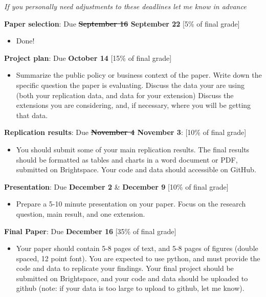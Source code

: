 \documentclass[compress, 8pt]{beamer}
\begin{document}
\begin{frame}{}

\alert{\emph{If you personally need adjustments to these deadlines let me know in advance}}

\textbf{Paper selection}: Due \textbf{\sout{September 16} September 22} [5\% of final grade]
\begin{itemize}
\item Done! 
\end{itemize}

\textbf{Project plan}: Due \textbf{October 14} [15\% of final grade] 
\begin{itemize}
\item Summarize the public policy or business context of the paper. 
Write down the specific question the paper is evaluating.
Discuss the data your are using (both your replication data, and data for your extension)
Discuss the extensions you are considering, and, if necessary, where you will be getting that data. 
\end{itemize} 

\textbf{Replication results}: \alert{Due \textbf{\sout{November 4} November 3}}: [10\% of final grade]
\begin{itemize}
\item You should submit some of your main replication results. The final results should be formatted as tables and charts in a word document or PDF, submitted on Brightspace. Your code and data should accessible on GitHub.
\end{itemize}

\textbf{Presentation}: Due \textbf{December 2} \& \textbf{December 9} [10\% of final grade]
\begin{itemize}
\item Prepare a 5-10 minute presentation on your paper. Focus on the research question, main result, and one extension. 
\end{itemize}

\textbf{Final Paper}: Due \textbf{December 16} [35\% of final grade]
\begin{itemize}
\item Your paper should contain 5-8 pages of text, and 5-8 pages of figures (double spaced, 12 point font).
You are expected to use python, and must provide the code and data to replicate your findings. 
Your final project should be submitted on Brightspace, and your code and data should be uploaded to github (note: if your data is too large to upload to github, let me know). 
\end{itemize}

\end{frame}
\end{document}
